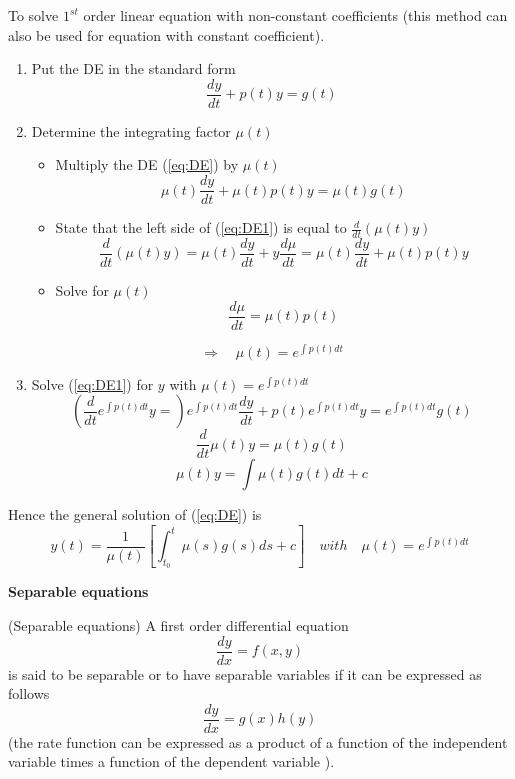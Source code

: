 To solve $1^{st}$ order linear equation with non-constant coefficients (this method can also be used for equation with constant coefficient).
\begin{enumerate}
\item Put the DE in the standard form
\begin{equation}\frac{dy}{dt}+p(t)y=g(t)\label{eq:DE}\end{equation}
\item Determine the integrating factor $\mu (t)$
\begin{itemize}
\item Multiply the DE (\ref{eq:DE}) by $\mu (t)$
\begin{equation}\mu (t)\frac{dy}{dt}+\mu (t)p(t)y=\mu
(t)g(t)\label{eq:DE1}\end{equation} 
\item  State that the left side of (\ref{eq:DE1}) is equal to $\frac{d}{dt}(\mu (t)y)$
$$\frac{d}{dt}(\mu (t)y)=\mu (t)\frac{dy}{dt}+y\frac{d \mu}{dt}=\mu (t)\frac{dy}{dt}+\mu
(t)p(t)y$$
\item Solve for $\mu (t)$
$$\frac{d \mu }{dt}=\mu (t) p(t)$$
\end{itemize}
$$\Rightarrow \quad \mu(t)=e^{\int p(t)dt}$$
\item Solve (\ref{eq:DE1}) for $y$ with $\mu(t)=e^{\int p(t)dt}$
$$\left(\frac{d}{dt}e^{\int p(t)dt}y=\right)e^{\int p(t)dt}\frac{dy}{dt}+p(t)e^{\int p(t)dt}y=e^{\int p(t)dt}g(t)$$
$$\frac{d}{dt}\mu(t)y=\mu(t)g(t)$$
$$\mu(t)y=\int \mu(t)g(t)dt +c$$
\end{enumerate}

Hence the general solution of (\ref{eq:DE}) is
$$y(t)=\frac{1}{\mu(t)}\left [\int_{t_0}^t \mu(s)g(s)ds +c\right ]
\quad with \quad \mu(t)=e^{\int p(t)dt}$$




{\bf Separable equations}



\begin{definition}(Separable equations) A first order differential equation
$$\frac{dy}{dx}=f(x,y)$$
is said to be separable or to have separable variables if it can be
expressed as follows
$$\frac{dy}{dx}=g(x)h(y)$$
(the rate function can be expressed as a product of a function of
the independent variable times a function of the dependent variable
).
\end{definition}


